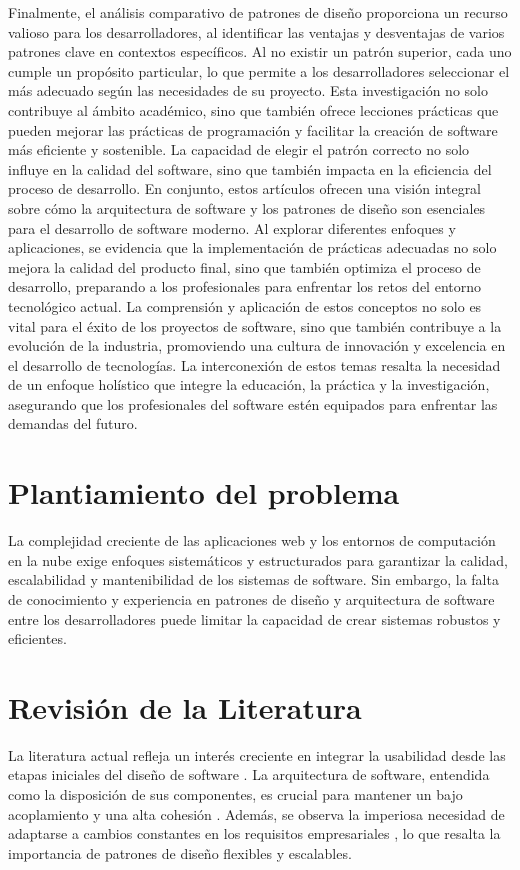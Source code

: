 \documentclass[twocolumn]{article}
\begin{document}
Finalmente, el análisis comparativo de patrones de diseño proporciona un recurso valioso para los desarrolladores, al identificar las ventajas y desventajas de varios patrones clave en contextos específicos. Al no existir un patrón superior, cada uno cumple un propósito particular, lo que permite a los desarrolladores seleccionar el más adecuado según las necesidades de su proyecto. Esta investigación no solo contribuye al ámbito académico, sino que también ofrece lecciones prácticas que pueden mejorar las prácticas de programación y facilitar la creación de software más eficiente y sostenible. La capacidad de elegir el patrón correcto no solo influye en la calidad del software, sino que también impacta en la eficiencia del proceso de desarrollo.
En conjunto, estos artículos ofrecen una visión integral sobre cómo la arquitectura de software y los patrones de diseño son esenciales para el desarrollo de software moderno. Al explorar diferentes enfoques y aplicaciones, se evidencia que la implementación de prácticas adecuadas no solo mejora la calidad del producto final, sino que también optimiza el proceso de desarrollo, preparando a los profesionales para enfrentar los retos del entorno tecnológico actual. La comprensión y aplicación de estos conceptos no solo es vital para el éxito de los proyectos de software, sino que también contribuye a la evolución de la industria, promoviendo una cultura de innovación y excelencia en el desarrollo de tecnologías. La interconexión de estos temas resalta la necesidad de un enfoque holístico que integre la educación, la práctica y la investigación, asegurando que los profesionales del software estén equipados para enfrentar las demandas del futuro.

\section{Plantiamiento del problema}
La complejidad creciente de las aplicaciones web y los entornos de computación en la nube exige enfoques sistemáticos y estructurados para garantizar la calidad, escalabilidad y mantenibilidad de los sistemas de software. Sin embargo, la falta de conocimiento y experiencia en patrones de diseño y arquitectura de software entre los desarrolladores puede limitar la capacidad de crear sistemas robustos y eficientes.

\section{Revisión de la Literatura}
La literatura actual refleja un interés creciente en integrar la
usabilidad desde las etapas iniciales del diseño de software
\cite{moreno2003}. La arquitectura de software, entendida como la
disposición de sus componentes, es crucial para mantener un bajo
acoplamiento y una alta cohesión \cite{romero2006}. Además, se observa
la imperiosa necesidad de adaptarse a cambios constantes en los
requisitos empresariales \cite{cristia2008}, lo que resalta la
importancia de patrones de diseño flexibles y escalables.
\end{document}
